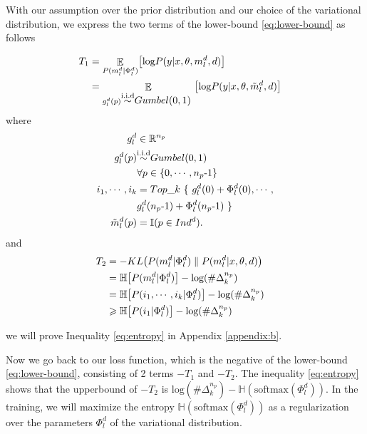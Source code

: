 \documentclass[11pt]{article}
\begin{document}
With our assumption over the prior distribution and our choice of the variational distribution, we express the two terms of the lower-bound \eqref{eq:lower-bound} as follows

\begin{align}
\hspace{-2.em}
T_1 &= \displaystyle{\mathop{\mathbb{E}}_{P(m_l^d | \Phi_l^d)}} \big[ \text{log} P(y | x,\theta,m_l^d, d)  \big] \nonumber \\
&= \displaystyle{\mathop{\mathbb{E}}_{g_l^d(p) \displaystyle{\mathop{\sim}^{\text{i.i.d}}} Gumbel(0,1) \ }} \big[ \text{log} P(y | x,\theta,\tilde{m}_l^d,d) \big] \nonumber
\end{align}
where
\begin{align}
\hspace{-2.em}
g_l^d & \in \mathbb{R}^{n_p} \nonumber \\
g_l^d(p) & \displaystyle{\mathop{\sim}^{\text{i.i.d}}} Gumbel(0,1) \nonumber \\
& \forall p \in \{ 0,\cdots,n_p\text{-}1 \} \nonumber \\
i_1, \cdots, i_k &= Top\_k \ \{ \ g_l^d(0) + \Phi_l^d(0), \cdots, \label{eq:top-k} \\ 
&g_l^d(n_p\text{-}1) + \Phi_l^d(n_p\text{-}1) \ \} \nonumber \\
\tilde{m}_l^d(p) &= \mathbb{I}(p \in Ind^d). \nonumber 
\end{align}
and
\begin{align}
\hspace{-2.em}
T_2 &= - KL \big( P(m_l^d | \Phi_l^d) \parallel P(m_l^d | x,\theta,d) \big) \nonumber \\ 
	&= \mathbb{H} \big[ P(m_l^d | \Phi_l^d) \big] - \text{log}(\#\Delta^{n_p}_k) \nonumber \\ 
	&= \mathbb{H} \big[ P(i_1,\cdots,i_k | \Phi_l^d) \big] - \text{log}(\#\Delta^{n_p}_k) \nonumber \\
	&\geqslant \mathbb{H} \big[ P(i_1 | \Phi_l^d) \big] - \text{log}(\#\Delta^{n_p}_k) \label{eq:entropy}
\end{align}

we will prove Inequality \eqref{eq:entropy} in Appendix \ref{appendix:b}.

Now we go back to our loss function, which is the negative of the lower-bound \eqref{eq:lower-bound}, consisting of 2 terms $-T_1$ and $-T_2$. The inequality \eqref{eq:entropy} shows that the upperbound of $-T_2$ is $\text{log}(\#\Delta^{n_p}_k) - \mathbb{H}(\text{softmax}(\Phi_l^d))$. In the training, we will maximize the entropy $\mathbb{H}(\text{softmax}(\Phi_l^d))$ as a regularization over the parameters $\Phi_l^d$ of the variational distribution.
\end{document}
